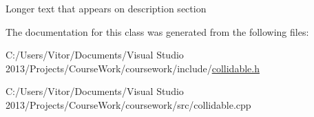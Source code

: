 Longer text that appears on description section 

The documentation for this class was generated from the following files\+:\begin{DoxyCompactItemize}
\item 
C\+:/\+Users/\+Vitor/\+Documents/\+Visual Studio 2013/\+Projects/\+Course\+Work/coursework/include/\hyperlink{collidable_8h}{collidable.\+h}\item 
C\+:/\+Users/\+Vitor/\+Documents/\+Visual Studio 2013/\+Projects/\+Course\+Work/coursework/src/collidable.\+cpp\end{DoxyCompactItemize}

